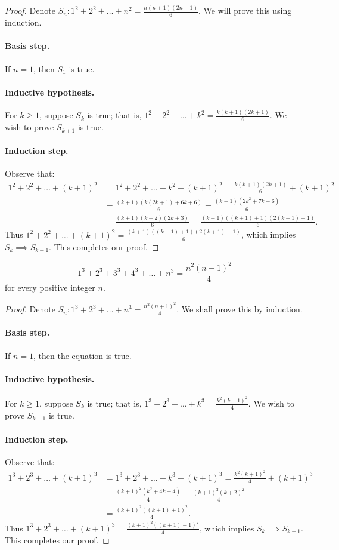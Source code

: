 \documentclass{exam}
\begin{document}
\begin{proof}
    Denote $S_n: 1^2 + 2^2 + \dots + n^2 = \frac{n(n+1)(2n+1)}6$. We will prove this using induction.
    \paragraph{Basis step.} If $n = 1$, then $S_1$ is true.
    \paragraph{Inductive hypothesis.} For $k\ge 1$, suppose $S_k$ is true; that is, $1^2 + 2^2 +\dots+k^2=\frac{k(k+1)(2k+1)}6$. We wish to prove $S_{k+1}$ is true.
    \paragraph{Induction step.} Observe that:
    \begin{align*}
        1^2 + 2^2 +\dots+(k+1)^2 &= 1^2 + 2^2 + \dots + k^2 + (k+1)^2 = \frac{k(k+1)(2k+1)}6 + (k+1)^2\\
        &= \frac{(k+1)(k(2k+1) + 6k+6)}6= \frac{(k+1)(2k^2 + 7k + 6)}{6}\\
        &=\frac{(k+1)(k+2)(2k+3)}6=\frac{(k+1)((k+1)+1)(2(k+1)+1)}6.
    \end{align*}
    Thus $1^2 + 2^2 +\dots+(k+1)^2 =\frac{(k+1)((k+1)+1)(2(k+1)+1)}6$, which implies $S_k\implies S_{k+1}$. This completes our proof.
\end{proof}

\begin{proposition}{10.3}
    $$1^3+2^3+3^3+4^3+\dots+n^3=\frac{n^2(n+1)^2}{4}$$ for every positive integer $n$.
\end{proposition}

\begin{proof}
    Denote $S_n:1^3+2^3+\dots+n^3=\frac{n^2(n+1)^2}4$. We shall prove this by induction.
    \paragraph{Basis step.} If $n =1$, then the equation is true.
    \paragraph{Inductive hypothesis.} For $k\ge 1$, suppose $S_k$ is true; that is, $1^3 + 2^3 +\dots+k^3 = \frac{k^2(k+1)^2}4$. We wish to prove $S_{k+1}$ is true.
    \paragraph{Induction step.} Observe that:
    \begin{align*}
        1^3 + 2^3 +\dots + (k+1)^3 &= 1^3 + 2^3 +\dots + k^3 + (k+1)^3 = \frac{k^2(k+1)^2}4 + (k+1)^3\\
        &=\frac{(k+1)^2(k^2+4k+4)}4=\frac{(k+1)^2(k+2)^2}4\\
        &=\frac{(k+1)^2((k+1)+1)^2}4.
    \end{align*}
    Thus $1^3+2^3+\dots+(k+1)^3=\frac{(k+1)^2((k+1)+1)^2}4$, which implies $S_k\implies S_{k+1}$. This completes our proof.
\end{proof}
\end{document}

